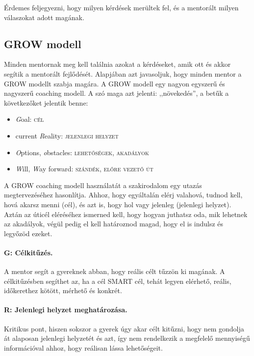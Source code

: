 Érdemes feljegyezni, hogy milyen kérdések merültek fel, és a mentorált
milyen válaszokat adott magának.

\hypertarget{grow-modell}{%
\subsection{GROW modell}\label{grow-modell}}

Minden mentornak meg kell találnia azokat a kérdéseket, amik ott és
akkor segítik a mentorált fejlődését. Alapjában azt javasoljuk, hogy
minden mentor a GROW modellt szabja magára. A GROW modell egy nagyon
egyszerű és nagyszerű coaching modell. A szó maga azt jelenti:
,,növekedés'', a betűk a következőket jelentik benne:

\begin{itemize}
\tightlist
\item
  \emph{G}oal: \textsc{cél}
\item
  current \emph{R}eality: \textsc{jelenlegi helyzet}
\item
  \emph{O}ptions, \emph{o}bstacles: \textsc{lehetőségek, akadályok}
\item
  \emph{W}ill, \emph{W}ay forward: \textsc{szándék, előre vezető út}
\end{itemize}

A GROW coaching modell használatát a szakirodalom egy utazás\break
megtervezéséhez hasonlítja. Ahhoz, hogy egyáltalán elérj valahová,
tudnod kell, hová akarsz menni (cél), és azt is, hogy hol vagy jelenleg
(jelenlegi helyzet). Aztán az úticél eléréséhez ismerned kell, hogy
hogyan juthatsz oda, mik lehetnek az akadályok, végül pedig el kell
határoznod magad, hogy el is indulsz és legyőzöd ezeket.

\paragraph{G: Célkitűzés.} A mentor segít a gyereknek abban, hogy reális célt tűzzön
ki magának. A célkitűzésben segíthet az, ha a cél SMART cél, tehát
legyen elérhető, reális, időkerethez kötött, mérhető és konkrét.

\paragraph{R: Jelenlegi helyzet meghatározása.} Kritikus pont, hiszen sokszor a
gyerek úgy akar célt kitűzni, hogy nem gondolja át alaposan jelenlegi
helyzetét és azt, így nem rendelkezik a megfelelő mennyiségű
információval ahhoz, hogy reálisan lássa lehetőségeit.

